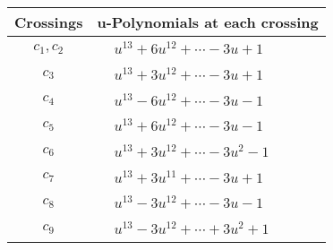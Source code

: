 \documentclass[1p]{elsarticle_modified}
\theoremstyle{definition}
\begin{document}
\begin{tabular}{m{50pt}|m{274pt}}
Crossings & \hspace{64pt}u-Polynomials at each crossing \\
\hline $$\begin{aligned}c_{1},c_{2}\end{aligned}$$&$\begin{aligned}
&u^{13}+6 u^{12}+\cdots-3 u+1
\end{aligned}$\\
\hline $$\begin{aligned}c_{3}\end{aligned}$$&$\begin{aligned}
&u^{13}+3 u^{12}+\cdots-3 u+1
\end{aligned}$\\
\hline $$\begin{aligned}c_{4}\end{aligned}$$&$\begin{aligned}
&u^{13}-6 u^{12}+\cdots-3 u-1
\end{aligned}$\\
\hline $$\begin{aligned}c_{5}\end{aligned}$$&$\begin{aligned}
&u^{13}+6 u^{12}+\cdots-3 u-1
\end{aligned}$\\
\hline $$\begin{aligned}c_{6}\end{aligned}$$&$\begin{aligned}
&u^{13}+3 u^{12}+\cdots-3 u^2-1
\end{aligned}$\\
\hline $$\begin{aligned}c_{7}\end{aligned}$$&$\begin{aligned}
&u^{13}+3 u^{11}+\cdots-3 u+1
\end{aligned}$\\
\hline $$\begin{aligned}c_{8}\end{aligned}$$&$\begin{aligned}
&u^{13}-3 u^{12}+\cdots-3 u-1
\end{aligned}$\\
\hline $$\begin{aligned}c_{9}\end{aligned}$$&$\begin{aligned}
&u^{13}-3 u^{12}+\cdots+3 u^2+1
\end{aligned}$\\

\end{tabular}
\end{document}
